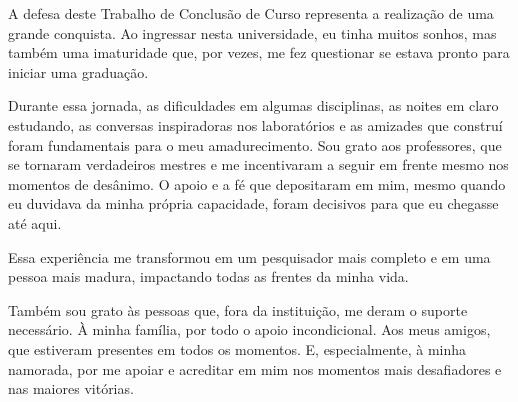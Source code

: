 A defesa deste Trabalho de Conclusão de Curso representa a realização de uma grande conquista. Ao ingressar nesta universidade, eu tinha muitos sonhos, mas também uma imaturidade que, por vezes, me fez questionar se estava pronto para iniciar uma graduação.

Durante essa jornada, as dificuldades em algumas disciplinas, as noites em claro estudando, as conversas inspiradoras nos laboratórios e as amizades que construí foram fundamentais para o meu amadurecimento. Sou grato aos professores, que se tornaram verdadeiros mestres e me incentivaram a seguir em frente mesmo nos momentos de desânimo. O apoio e a fé que depositaram em mim, mesmo quando eu duvidava da minha própria capacidade, foram decisivos para que eu chegasse até aqui.

Essa experiência me transformou em um pesquisador mais completo e em uma pessoa mais madura, impactando todas as frentes da minha vida.

Também sou grato às pessoas que, fora da instituição, me deram o suporte necessário. À minha família, por todo o apoio incondicional. Aos meus amigos, que estiveram presentes em todos os momentos. E, especialmente, à minha namorada, por me apoiar e acreditar em mim nos momentos mais desafiadores e nas maiores vitórias.%